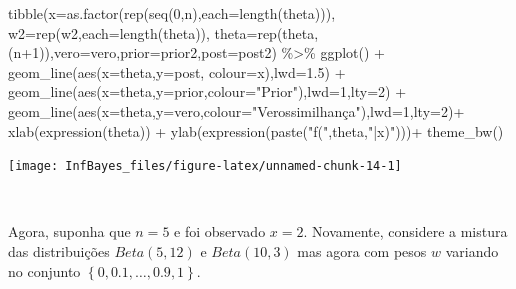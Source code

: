 \documentclass[
]{book}
\newenvironment{Shaded}{\begin{snugshade}}{\end{snugshade}}
\newcommand{\AttributeTok}[1]{\textcolor[rgb]{0.77,0.63,0.00}{#1}}
\newcommand{\DecValTok}[1]{\textcolor[rgb]{0.00,0.00,0.81}{#1}}
\newcommand{\FloatTok}[1]{\textcolor[rgb]{0.00,0.00,0.81}{#1}}
\newcommand{\FunctionTok}[1]{\textcolor[rgb]{0.00,0.00,0.00}{#1}}
\newcommand{\NormalTok}[1]{#1}
\newcommand{\SpecialCharTok}[1]{\textcolor[rgb]{0.00,0.00,0.00}{#1}}
\newcommand{\StringTok}[1]{\textcolor[rgb]{0.31,0.60,0.02}{#1}}
\begin{document}
\begin{Shaded}
\begin{Highlighting}[]
\FunctionTok{tibble}\NormalTok{(}\AttributeTok{x=}\FunctionTok{as.factor}\NormalTok{(}\FunctionTok{rep}\NormalTok{(}\FunctionTok{seq}\NormalTok{(}\DecValTok{0}\NormalTok{,n),}\AttributeTok{each=}\FunctionTok{length}\NormalTok{(theta))),}
    \AttributeTok{w2=}\FunctionTok{rep}\NormalTok{(w2,}\AttributeTok{each=}\FunctionTok{length}\NormalTok{(theta)),}
    \AttributeTok{theta=}\FunctionTok{rep}\NormalTok{(theta,(n}\SpecialCharTok{+}\DecValTok{1}\NormalTok{)),}\AttributeTok{vero=}\NormalTok{vero,}\AttributeTok{prior=}\NormalTok{prior2,}\AttributeTok{post=}\NormalTok{post2) }\SpecialCharTok{\%\textgreater{}\%} 
  \FunctionTok{ggplot}\NormalTok{() }\SpecialCharTok{+} 
  \FunctionTok{geom\_line}\NormalTok{(}\FunctionTok{aes}\NormalTok{(}\AttributeTok{x=}\NormalTok{theta,}\AttributeTok{y=}\NormalTok{post, }\AttributeTok{colour=}\NormalTok{x),}\AttributeTok{lwd=}\FloatTok{1.5}\NormalTok{) }\SpecialCharTok{+} 
  \FunctionTok{geom\_line}\NormalTok{(}\FunctionTok{aes}\NormalTok{(}\AttributeTok{x=}\NormalTok{theta,}\AttributeTok{y=}\NormalTok{prior,}\AttributeTok{colour=}\StringTok{"Prior"}\NormalTok{),}\AttributeTok{lwd=}\DecValTok{1}\NormalTok{,}\AttributeTok{lty=}\DecValTok{2}\NormalTok{) }\SpecialCharTok{+}
  \FunctionTok{geom\_line}\NormalTok{(}\FunctionTok{aes}\NormalTok{(}\AttributeTok{x=}\NormalTok{theta,}\AttributeTok{y=}\NormalTok{vero,}\AttributeTok{colour=}\StringTok{"Verossimilhança"}\NormalTok{),}\AttributeTok{lwd=}\DecValTok{1}\NormalTok{,}\AttributeTok{lty=}\DecValTok{2}\NormalTok{)}\SpecialCharTok{+}
  \FunctionTok{xlab}\NormalTok{(}\FunctionTok{expression}\NormalTok{(theta)) }\SpecialCharTok{+}   
  \FunctionTok{ylab}\NormalTok{(}\FunctionTok{expression}\NormalTok{(}\FunctionTok{paste}\NormalTok{(}\StringTok{"f("}\NormalTok{,theta,}\StringTok{"|x)"}\NormalTok{)))}\SpecialCharTok{+}
  \FunctionTok{theme\_bw}\NormalTok{()}
\end{Highlighting}
\end{Shaded}

\begin{center}\texttt{[image: InfBayes\_files/figure-latex/unnamed-chunk-14-1]} \end{center}

\(~\)

Agora, suponha que \(n=5\) e foi observado \(x=2\). Novamente, considere a mistura das distribuições \(Beta(5,12)\) e \(Beta(10,3)\) mas agora com pesos \(w\) variando no conjunto \(\left\{0,0.1,\ldots,0.9,1\right\}\).
\end{document}
